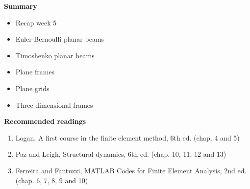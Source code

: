 \documentclass[aspectratio=169]{beamer}
\begin{document}
{  \begin{frame}
    \textbf{\large Summary}
    \begin{itemize}
      \item Recap week 5
      \item Euler-Bernoulli planar beams
      \item Timoshenko planar beams
      \item Plane frames
      \item Plane grids
      \item Three-dimensional frames
    \end{itemize}
    \vspace{.5cm}

    \textbf{\large Recommended readings}
    \begin{enumerate}
      \item Logan, A first course in the finite element method, 6th ed.
            (chap. 4 and 5)
      \item Paz and Leigh, Structural dynamics, 6th ed.  (chap. 10, 11, 12 and 13)
      \item Ferreira and Fantuzzi, MATLAB Codes for Finite Element Analysis, 2nd ed. (chap. 6, 7, 8, 9 and 10)
    \end{enumerate}
  \end{frame}
}
\end{document}
